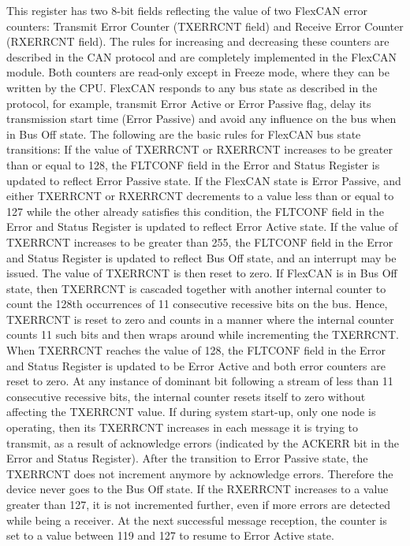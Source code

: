 This register has two 8-\/bit fields reflecting the value of two Flex\+C\+AN error counters\+: Transmit Error Counter (T\+X\+E\+R\+R\+C\+NT field) and Receive Error Counter (R\+X\+E\+R\+R\+C\+NT field). The rules for increasing and decreasing these counters are described in the C\+AN protocol and are completely implemented in the Flex\+C\+AN module. Both counters are read-\/only except in Freeze mode, where they can be written by the C\+PU. Flex\+C\+AN responds to any bus state as described in the protocol, for example, transmit Error Active or Error Passive flag, delay its transmission start time (Error Passive) and avoid any influence on the bus when in Bus Off state. The following are the basic rules for Flex\+C\+AN bus state transitions\+: If the value of T\+X\+E\+R\+R\+C\+NT or R\+X\+E\+R\+R\+C\+NT increases to be greater than or equal to 128, the F\+L\+T\+C\+O\+NF field in the Error and Status Register is updated to reflect \textquotesingle{}Error Passive\textquotesingle{} state. If the Flex\+C\+AN state is \textquotesingle{}Error Passive\textquotesingle{}, and either T\+X\+E\+R\+R\+C\+NT or R\+X\+E\+R\+R\+C\+NT decrements to a value less than or equal to 127 while the other already satisfies this condition, the F\+L\+T\+C\+O\+NF field in the Error and Status Register is updated to reflect \textquotesingle{}Error Active\textquotesingle{} state. If the value of T\+X\+E\+R\+R\+C\+NT increases to be greater than 255, the F\+L\+T\+C\+O\+NF field in the Error and Status Register is updated to reflect \textquotesingle{}Bus Off\textquotesingle{} state, and an interrupt may be issued. The value of T\+X\+E\+R\+R\+C\+NT is then reset to zero. If Flex\+C\+AN is in \textquotesingle{}Bus Off\textquotesingle{} state, then T\+X\+E\+R\+R\+C\+NT is cascaded together with another internal counter to count the 128th occurrences of 11 consecutive recessive bits on the bus. Hence, T\+X\+E\+R\+R\+C\+NT is reset to zero and counts in a manner where the internal counter counts 11 such bits and then wraps around while incrementing the T\+X\+E\+R\+R\+C\+NT. When T\+X\+E\+R\+R\+C\+NT reaches the value of 128, the F\+L\+T\+C\+O\+NF field in the Error and Status Register is updated to be \textquotesingle{}Error Active\textquotesingle{} and both error counters are reset to zero. At any instance of dominant bit following a stream of less than 11 consecutive recessive bits, the internal counter resets itself to zero without affecting the T\+X\+E\+R\+R\+C\+NT value. If during system start-\/up, only one node is operating, then its T\+X\+E\+R\+R\+C\+NT increases in each message it is trying to transmit, as a result of acknowledge errors (indicated by the A\+C\+K\+E\+RR bit in the Error and Status Register). After the transition to \textquotesingle{}Error Passive\textquotesingle{} state, the T\+X\+E\+R\+R\+C\+NT does not increment anymore by acknowledge errors. Therefore the device never goes to the \textquotesingle{}Bus Off\textquotesingle{} state. If the R\+X\+E\+R\+R\+C\+NT increases to a value greater than 127, it is not incremented further, even if more errors are detected while being a receiver. At the next successful message reception, the counter is set to a value between 119 and 127 to resume to \textquotesingle{}Error Active\textquotesingle{} state. 

